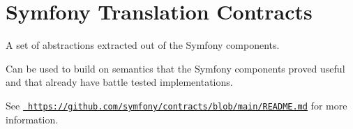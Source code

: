 \chapter{Symfony Translation Contracts}
\hypertarget{md_vendor_2symfony_2translation-contracts_2_r_e_a_d_m_e}{}\label{md_vendor_2symfony_2translation-contracts_2_r_e_a_d_m_e}
A set of abstractions extracted out of the Symfony components.

Can be used to build on semantics that the Symfony components proved useful and that already have battle tested implementations.

See \href{https://github.com/symfony/contracts/blob/main/README.md}{\texttt{ https\+://github.\+com/symfony/contracts/blob/main/\+README.\+md}} for more information. 